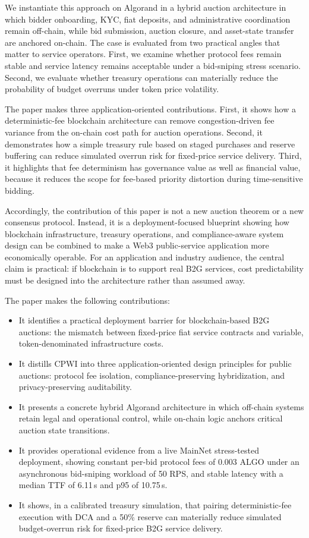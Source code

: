 \documentclass[runningheads]{llncs}
\begin{document}
We instantiate this approach on Algorand in a hybrid auction architecture in which bidder onboarding, KYC, fiat deposits, and administrative coordination remain off-chain, while bid submission, auction closure, and asset-state transfer are anchored on-chain. The case is evaluated from two practical angles that matter to service operators. First, we examine whether protocol fees remain stable and service latency remains acceptable under a bid-sniping stress scenario. Second, we evaluate whether treasury operations can materially reduce the probability of budget overruns under token price volatility.

The paper makes three application-oriented contributions. First, it shows how a deterministic-fee blockchain architecture can remove congestion-driven fee variance from the on-chain cost path for auction operations. Second, it demonstrates how a simple treasury rule based on staged purchases and reserve buffering can reduce simulated overrun risk for fixed-price service delivery. Third, it highlights that fee determinism has governance value as well as financial value, because it reduces the scope for fee-based priority distortion during time-sensitive bidding.

Accordingly, the contribution of this paper is not a new auction theorem or a new consensus protocol. Instead, it is a deployment-focused blueprint showing how blockchain infrastructure, treasury operations, and compliance-aware system design can be combined to make a Web3 public-service application more economically operable. For an application and industry audience, the central claim is practical: if blockchain is to support real B2G services, cost predictability must be designed into the architecture rather than assumed away.

The paper makes the following contributions:
\begin{itemize}
    \item It identifies a practical deployment barrier for blockchain-based B2G auctions: the mismatch between fixed-price fiat service contracts and variable, token-denominated infrastructure costs.
    \item It distills CPWI into three application-oriented design principles for public auctions: protocol fee isolation, compliance-preserving hybridization, and privacy-preserving auditability.
    \item It presents a concrete hybrid Algorand architecture in which off-chain systems retain legal and operational control, while on-chain logic anchors critical auction state transitions.
    \item It provides operational evidence from a live MainNet stress-tested deployment, showing constant per-bid protocol fees of 0.003 ALGO under an asynchronous bid-sniping workload of 50 RPS, and stable latency with a median TTF of 6.11\,s and p95 of 10.75\,s.
    \item It shows, in a calibrated treasury simulation, that pairing deterministic-fee execution with DCA and a 50\% reserve can materially reduce simulated budget-overrun risk for fixed-price B2G service delivery.
\end{itemize}
\end{document}
